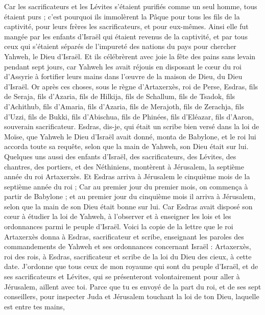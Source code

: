 \begin{multicols}{2}
Car les sacrificateurs et les Lévites s'étaient purifiés comme un seul homme, tous étaient purs ; c'est pourquoi ils immolèrent la Pâque pour tous les fils de la captivité, pour leurs frères les sacrificateurs, et pour eux-mêmes.
Ainsi elle fut mangée par les enfants d'Israël qui étaient revenus de la captivité, et par tous ceux qui s'étaient séparés de l'impureté des nations du pays pour chercher Yahweh, le Dieu d'Israël.
Et ils célébrèrent avec joie la fête des pains sans levain pendant sept jours, car Yahweh les avait réjouis en disposant le cœur du roi d'Assyrie à fortifier leurs mains dans l'œuvre de la maison de Dieu, du Dieu d'Israël.
\VerseOne{}Or après ces choses, sous le règne d'Artaxerxès, roi de Perse, Esdras, fils de Seraja, fils d'Azaria, fils de Hilkija,
fils de Schallum, fils de Tsadok, fils d'Achithub,
fils d'Amaria, fils d'Azaria, fils de Merajoth,
fils de Zerachja, fils d'Uzzi, fils de Bukki,
fils d'Abischua, fils de Phinées, fils d'Eléazar, fils d'Aaron, souverain sacrificateur.
Esdras, dis-je, qui était un scribe bien versé dans la loi de Moïse, que Yahweh le Dieu d'Israël avait donné, monta de Babylone, et le roi lui accorda toute sa requête, selon que la main de Yahweh, son Dieu était sur lui.
Quelques uns aussi des enfants d'Israël, des sacrificateurs, des Lévites, des chantres, des portiers, et des Néthiniens, montèrent à Jérusalem, la septième année du roi Artaxerxès.
Et Esdras arriva à Jérusalem le cinquième mois de la septième année du roi ;
Car au premier jour du premier mois, on commença à partir de Babylone ; et au premier jour du cinquième mois il arriva à Jérusalem, selon que la main de son Dieu était bonne sur lui.
Car Esdras avait disposé son cœur à étudier la loi de Yahweh, à l'observer et à enseigner les lois et les ordonnances parmi le peuple d'Israël.
Voici la copie de la lettre que le roi Artaxerxès donna à Esdras, sacrificateur et scribe, enseignant les paroles des commandements de Yahweh et ses ordonnances concernant Israël :
Artaxerxès, roi des rois, à Esdras, sacrificateur et scribe de la loi du Dieu des cieux, à cette date.
J'ordonne que tous ceux de mon royaume qui sont du peuple d'Israël, et de ses sacrificateurs et Lévites, qui se présenteront volontairement pour aller à Jérusalem, aillent avec toi.
Parce que tu es envoyé de la part du roi, et de ses sept conseillers, pour inspecter Juda et Jérusalem touchant la loi de ton Dieu, laquelle est entre tes mains,

\end{multicols}

